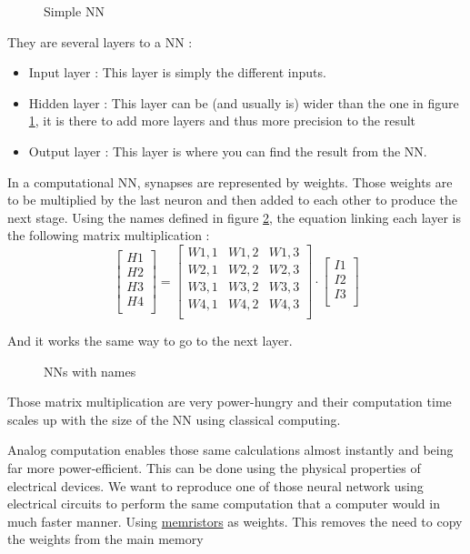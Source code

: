 \begin{figure}[h!]
  \centering
  
  \caption{Simple \acl{NN}}
  \label{fig:snn}
\end{figure}



They are several layers to a \ac{NN} :
\begin{itemize}
  \item Input layer : This layer is simply the different inputs.
  \item Hidden layer : This layer can be (and usually is) wider than the one in figure \ref{fig:snn}, it is there to add more layers and thus more precision to the result
  \item Output layer : This layer is where you can find the result from the \ac{NN}.
\end{itemize}

In a computational \ac{NN}, synapses are represented by weights. Those weights are to be multiplied by the last neuron and then added to each other to produce the next stage. Using the names defined in figure \ref{fig:nn_explained}, the equation linking each layer is the following matrix multiplication :
\begin{equation}
  \begin{bmatrix}
    H1\\ H2\\ H3\\ H4\\
  \end{bmatrix}
  =
  \begin{bmatrix}
    W1,1 & W1,2 & W1,3\\
    W2,1 & W2,2 & W2,3\\
    W3,1 & W3,2 & W3,3\\
    W4,1 & W4,2 & W4,3\\
  \end{bmatrix}
  \cdot
  \begin{bmatrix}
    I1\\ I2\\ I3\\
  \end{bmatrix}
\end{equation}

And it works the same way to go to the next layer.

\begin{figure}[h!]
  \centering
  
  \caption{\aclp{NN} with names}
  \label{fig:nn_explained}
\end{figure}

Those matrix multiplication are very power-hungry and their computation time scales up with the size of the \ac{NN} using classical computing.

Analog computation enables those same calculations almost instantly and being far more power-efficient. This can be done using the physical properties of electrical devices.
We want to reproduce one of those neural network using electrical circuits to perform the same computation that a computer would in much faster manner.
Using \hyperref[subsec:memristors]{memristors} as weights. This removes the need to copy the weights from the main memory

